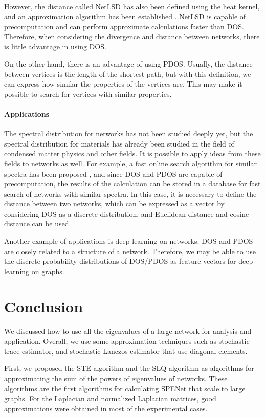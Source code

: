 \documentclass[senior,final,11pt]{iscs-thesis}
\begin{document}
However, the distance called NetLSD has also been defined using the heat kernel, and an approximation algorithm has been established \cite{tsitsulin2018netlsd,tsitsulin2020just}. NetLSD is capable of precomputation and can perform approximate calculations faster than DOS. Therefore, when considering the divergence and distance between networks, there is little advantage in using DOS.

On the other hand, there is an advantage of using PDOS. Usually, the distance between vertices is the length of the shortest path, but with this definition, we can express how similar the properties of the vertices are. This may make it possible to search for vertices with similar properties.

\subsubsection{Applications}
The spectral distribution for networks has not been studied deeply yet, but the spectral distribution for materials has already been studied in the field of condensed matter physics and other fields. It is possible to apply ideas from these fields to networks as well. For example, a fast online search algorithm for similar spectra has been proposed \cite{borysov2018online,geilhufe2018towards}, and since DOS and PDOS are capable of precomputation, the results of the calculation can be stored in a database for fast search of networks with similar spectra. In this case, it is necessary to define the distance between two networks, which can be expressed as a vector by considering DOS as a discrete distribution, and Euclidean distance and cosine distance can be used.

Another example of applications is deep learning on networks. DOS and PDOS are closely related to a structure of a network. Therefore, we may be able to use the discrete probability distributions of DOS/PDOS as feature vectors for deep learning on graphs.

\chapter{Conclusion}
We discussed how to use all the eigenvalues of a large network for analysis and application. Overall, we use some approximation techniques such as stochastic trace estimator, and stochastic Lanczos estimator that use diagonal elements.

First, we proposed the STE algorithm and the SLQ algorithm as algorithms for approximating the sum of the powers of eigenvalues of networks. These algorithms are the first algorithms for calculating SPENet that scale to large graphs. For the Laplacian and normalized Laplacian matrices, good approximations were obtained in most of the experimental cases.
\end{document}
